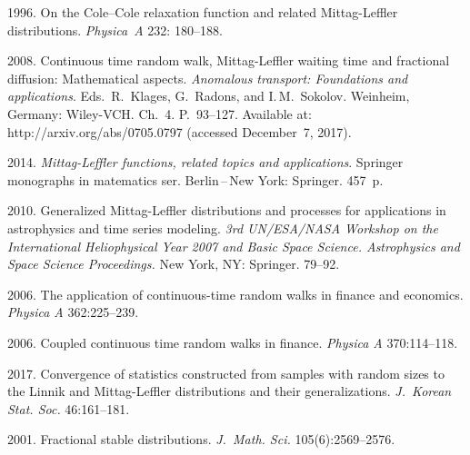   \begin{multicols}{2}

\renewcommand{\bibname}{\protect\rmfamily References}

{\small\frenchspacing
 {%
 \begin{thebibliography}{99}
 
 1996. On the Cole--Cole
relaxation function and related Mittag-Leffler distributions. \textit{Physica~A} 
232: 180--188.


 2008. Continuous time random walk, Mittag-Leffler
waiting time and fractional diffusion: Mathematical aspects.
\textit{Anomalous transport: Foundations and applications}. 
Eds.\ R.~Klages, G.~Radons, and I.\,M.~Sokolov. Weinheim,
Germany: Wiley-VCH. Ch.~4. P.~93--127.
Available at: {\sf http://arxiv.org/abs/0705.0797}
(accessed December~7, 2017).

 2014. 
\textit{Mittag-Leffler
functions, related topics and applications}. Springer monographs in matematics ser.
Berlin\,--\,New York:
Springer.  457~p.



 2010. Generalized
Mittag-Leffler distributions and processes for applications in
astrophysics and time series modeling. \textit{3rd
UN/ESA/NASA Workshop on the International Heliophysical Year 2007
and Basic Space Science. Astrophysics and Space Science
Proceedings.}  New York, NY: Springer. 79--92.

 2006. The application of continuous-time random
walks in finance and economics. \textit{Physica A} 362:225--239.

 2006. Coupled continuous time random
walks in finance. \textit{Physica A} 370:114--118.



 2017. Convergence of statistics constructed
from samples with random sizes to the Linnik and Mittag-Leffler
distributions and their generalizations. \textit{J.~Korean
Stat. Soc.} 46:161--181.

 2001. Fractional stable
distributions. \textit{J.~Math. Sci.} 105(6):2569--2576.


\end{thebibliography}}}
\end{multicols}
